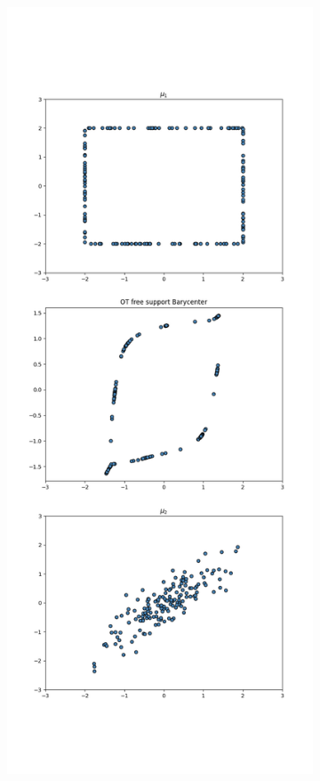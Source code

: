 \documentclass[a4paper, 11pt]{article}
\begin{document}
\begin{figure}
    \begin{subfigure}{0.5\textwidth}
        \centering
        \includegraphics[width=\textwidth]{figures/ot_barycenter_reg0.5.png}

\end{subfigure}
\end{figure}
\end{document}
